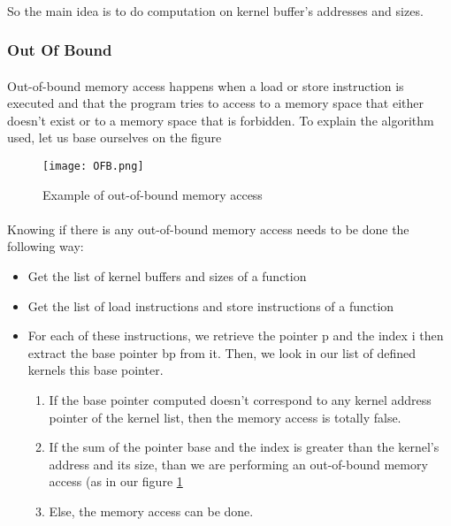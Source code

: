 \documentclass{article}
\begin{document}
\begin{itemize}
\paragraph{}
So the main idea is to do computation on kernel buffer's addresses and sizes.

\subsubsection{Out Of Bound}
\paragraph{}
Out-of-bound memory access happens when a load or store instruction is executed and that the program tries to access to a memory space that either doesn't exist or to a memory space that is forbidden.
To explain the algorithm used, let us base ourselves on the figure 

\begin{figure}[h]
	\centering
	\texttt{[image: OFB.png]}
	\caption{Example of out-of-bound memory access}
	\label{fig:OFB}
\end{figure}

\paragraph{}
Knowing if there is any out-of-bound memory access needs to be done the following way: 
\begin{itemize}
\item Get the list of kernel buffers and sizes of a function
\item Get the list of load instructions and store instructions of a function
\item For each of these instructions, we retrieve the pointer p and the index i then extract the base pointer bp from it. Then, we look in our list of defined kernels this base pointer. 
    \begin{enumerate}
    \item If the base pointer computed doesn't correspond to any kernel address pointer of the kernel list, then the memory access is totally false. 
    \item If the sum of the pointer base and the index is greater than the kernel's address and its size, than we are performing an out-of-bound memory access (as in our figure \ref{fig:OFB}
    \item Else, the memory access can be done.
    \end{enumerate}
\end{itemize}


\end{itemize}
\end{document}
